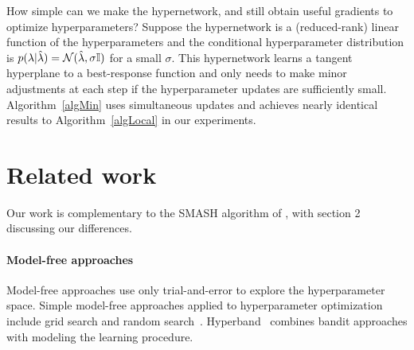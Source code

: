 \documentclass{article} %
\newcommand{\param}{\mathrm{w}} %
\newcommand{\hyper}{\lambda} %
\newcommand{\responseParam}{\phi} %
\newcommand{\approxResponseSymbol}[1]{\param_{#1}} %
\newcommand{\approxResponse}[2]{\approxResponseSymbol{#2} ( #1 )} %
\newcommand{\sampleRename}[1]{#1} %
\newcommand{\curRename}[1]{\smash{\hat{#1}}} %
\newcommand{\hyperDistVar}{p ( \sampleRename{\hyper} | \curRename{\hyper} )} %
\newcommand{\phyper}{p \left( \hyper \right)}
\begin{document}
How simple can we make the hypernetwork, and still obtain useful gradients to optimize hyperparameters?
Suppose the hypernetwork is a (reduced-rank) linear function of the hyperparameters and the conditional hyperparameter distribution is $\hyperDistVar = \mathcal{N} ( \curRename{\hyper}, \sigma \mathbb{I} )$ for a small $\sigma$.
This hypernetwork learns a tangent hyperplane to a best-response function and only needs to make minor adjustments at each step if the hyperparameter updates are sufficiently small.
Algorithm~\ref{algMin} uses simultaneous updates and achieves nearly identical results to Algorithm~\ref{algLocal} in our experiments.


\section{Related work}
Our work is complementary to the SMASH algorithm of \citet{brock2017smash}, with section 2 discussing our differences.

\paragraph{Model-free approaches}
Model-free approaches use only trial-and-error to explore the hyperparameter space.
Simple model-free approaches applied to hyperparameter optimization include grid search and random search~\citep{bergstra2012random}.
Hyperband~\citep{li2016hyperband} combines bandit approaches with modeling the learning procedure.
\end{document}
